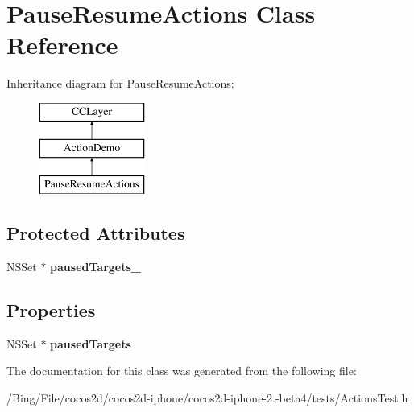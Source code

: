 \hypertarget{interface_pause_resume_actions}{\section{Pause\-Resume\-Actions Class Reference}
\label{interface_pause_resume_actions}
}
Inheritance diagram for Pause\-Resume\-Actions\-:\begin{figure}[H]
\begin{center}
\leavevmode
\includegraphics[height=3.000000cm]{interface_pause_resume_actions}
\end{center}
\end{figure}
\subsection*{Protected Attributes}
\begin{DoxyCompactItemize}
\item 
\hypertarget{interface_pause_resume_actions_abd195ed5e119e2fea84e15f641a9f8ce}{N\-S\-Set $\ast$ {\bfseries paused\-Targets\-\_\-}}\label{interface_pause_resume_actions_abd195ed5e119e2fea84e15f641a9f8ce}

\end{DoxyCompactItemize}
\subsection*{Properties}
\begin{DoxyCompactItemize}
\item 
\hypertarget{interface_pause_resume_actions_a7e7289405e3a9127cc812232b7e25bc6}{N\-S\-Set $\ast$ {\bfseries paused\-Targets}}\label{interface_pause_resume_actions_a7e7289405e3a9127cc812232b7e25bc6}

\end{DoxyCompactItemize}


The documentation for this class was generated from the following file\-:\begin{DoxyCompactItemize}
\item 
/\-Bing/\-File/cocos2d/cocos2d-\/iphone/cocos2d-\/iphone-\/2.-\/beta4/tests/Actions\-Test.\-h\end{DoxyCompactItemize}

